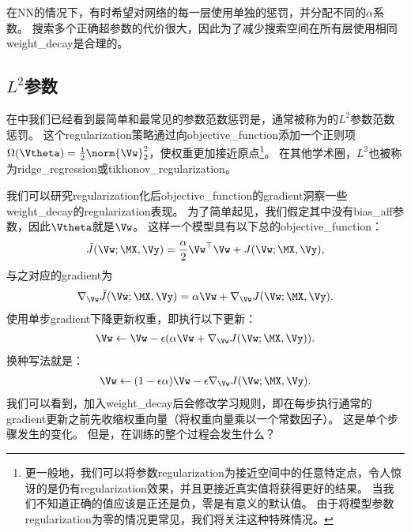 在\gls{NN}的情况下，有时希望对网络的每一层使用单独的惩罚，并分配不同的$\alpha$系数。
搜索多个正确超参数的代价很大，因此为了减少搜索空间在所有层使用相同\gls{weight_decay}是合理的。


\subsection{$L^2$参数}
\label{sec:l2_parameter_regularization}
在中我们已经看到最简单和最常见的参数范数惩罚是，通常被称为的$L^2$参数范数惩罚。
这个\gls{regularization}策略通过向\gls{objective_function}添加一个正则项$\Omega(\Vtheta) = \frac{1}{2} \norm{\Vw}_2^2$，使权重更加接近原点\footnote{更一般地，我们可以将参数\gls{regularization}为接近空间中的任意特定点，令人惊讶的是仍有\gls{regularization}效果，并且更接近真实值将获得更好的结果。
当我们不知道正确的值应该是正还是负，零是有意义的默认值。
由于将模型参数\gls{regularization}为零的情况更常见，我们将关注这种特殊情况。}。
在其他学术圈，$L^2$也被称为\gls{ridge_regression}或\gls{tikhonov_regularization}。

我们可以研究\gls{regularization}化后\gls{objective_function}的\gls{gradient}洞察一些\gls{weight_decay}的\gls{regularization}表现。
为了简单起见，我们假定其中没有\gls{bias_aff}参数，因此$\Vtheta$就是$\Vw$。
这样一个模型具有以下总的\gls{objective_function}：
\begin{align}
  \tilde{J}(\Vw;\MX, \Vy) =\frac{\alpha}{2} \Vw^\top \Vw +  J(\Vw;\MX, \Vy),
\end{align}
与之对应的\gls{gradient}为
\begin{align}
 \nabla_{\Vw} \tilde{J}(\Vw;\MX,\Vy) =\alpha \Vw +  \nabla_{\Vw} J(\Vw;\MX, \Vy).
\end{align}
使用单步\gls{gradient}下降更新权重，即执行以下更新：
\begin{align}
 \Vw \leftarrow \Vw - \epsilon(\alpha \Vw + \nabla_{\Vw} J(\Vw;\MX, \Vy)).
\end{align}
换种写法就是：
\begin{align}
 \Vw \leftarrow (1-\epsilon \alpha)\Vw - \epsilon \nabla_{\Vw} J(\Vw;\MX, \Vy).
\end{align}
我们可以看到，加入\gls{weight_decay}后会修改学习规则，即在每步执行通常的\gls{gradient}更新之前先收缩权重向量（将权重向量乘以一个常数因子）。
这是单个步骤发生的变化。
但是，在训练的整个过程会发生什么？


